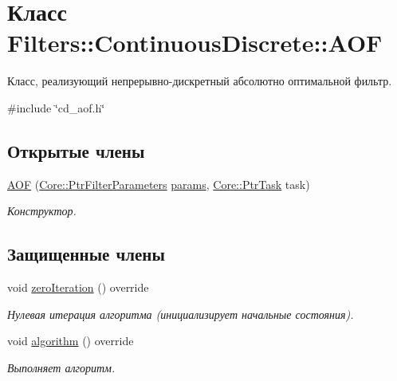 \hypertarget{class_filters_1_1_continuous_discrete_1_1_a_o_f}{}\section{Класс Filters\+:\+:Continuous\+Discrete\+:\+:A\+OF}
\label{class_filters_1_1_continuous_discrete_1_1_a_o_f}


Класс, реализующий непрерывно-\/дискретный абсолютно оптимальной фильтр.  




{\ttfamily \#include \char`\"{}cd\+\_\+aof.\+h\char`\"{}}

\subsection*{Открытые члены}
\begin{DoxyCompactItemize}
\item 
\hypertarget{class_filters_1_1_continuous_discrete_1_1_a_o_f_a4ebfbe00caffe58eee6f8c06e25997db}{}\label{class_filters_1_1_continuous_discrete_1_1_a_o_f_a4ebfbe00caffe58eee6f8c06e25997db} 
\hyperlink{class_filters_1_1_continuous_discrete_1_1_a_o_f_a4ebfbe00caffe58eee6f8c06e25997db}{A\+OF} (\hyperlink{namespace_core_a4811af8148ba137d644b9a61a042cf03}{Core\+::\+Ptr\+Filter\+Parameters} \hyperlink{class_core_1_1_filter_a44aa749b49ba46256975ce545531ecf7}{params}, \hyperlink{namespace_core_abfda8f69fcacfcea2696549b548ed737}{Core\+::\+Ptr\+Task} task)
\begin{DoxyCompactList}\small\item\em Конструктор. \end{DoxyCompactList}\end{DoxyCompactItemize}
\subsection*{Защищенные члены}
\begin{DoxyCompactItemize}
\item 
void \hyperlink{class_filters_1_1_continuous_discrete_1_1_a_o_f_ab350a4de87a9e2c2e8b01e178d61f3b5}{zero\+Iteration} () override
\begin{DoxyCompactList}\small\item\em Нулевая итерация алгоритма (инициализирует начальные состояния). \end{DoxyCompactList}\item 
void \hyperlink{class_filters_1_1_continuous_discrete_1_1_a_o_f_a050849ffe1ada992988218805721914d}{algorithm} () override
\begin{DoxyCompactList}\small\item\em Выполняет алгоритм. \end{DoxyCompactList}\end{DoxyCompactItemize}
